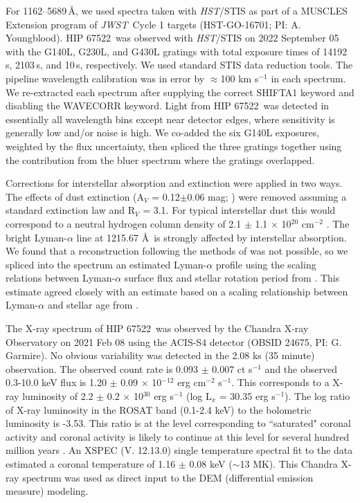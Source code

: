 \documentclass[twocolumn]{aastex63} %
\newcommand{\jwst}{\textit{JWST}}
\newcommand{\hst}{\textit{HST}}
\newcommand{\starname}{HIP 67522}
\begin{document}
For 1162--5689\,\AA, we used spectra taken with \hst/STIS as part of a MUSCLES Extension program of \jwst\ Cycle 1 targets (HST-GO-16701; PI: A. Youngblood). \starname\ was observed with \hst/STIS on 2022 September 05 with the G140L, G230L, and G430L gratings with total exposure times of 14192\,s, 2103\,s, and 10\,s, respectively. We used standard STIS data reduction tools. The pipeline wavelength calibration was in error by $\approx$100 km s$^{-1}$ in each spectrum. We re-extracted each spectrum after supplying the correct SHIFTA1 keyword and disabling the WAVECORR keyword. Light from \starname\ was detected in essentially all wavelength bins except near detector edges, where sensitivity is generally low and/or noise is high. We co-added the six G140L exposures, weighted by the flux uncertainty, then spliced the three gratings together using the contribution from the bluer spectrum where the gratings overlapped.  

Corrections for interstellar absorption and extinction were applied in two ways. The effects of dust extinction (A$_V$ = 0.12$\pm$0.06 mag; \citealt{Rizzuto2020}) were removed assuming a standard extinction law and R$_V$ = 3.1. For typical interstellar dust this would correspond to a neutral hydrogen column density of 2.1 $\pm$ 1.1 $\times$ 10$^{20}$ cm$^{-2}$ \citep{Predehl1995}. The bright Lyman-$\alpha$ line at 1215.67 \AA\ is strongly affected by interstellar  absorption. We found that a reconstruction following the methods of \cite{Youngblood2016} was not possible, so we spliced into the spectrum an estimated Lyman-$\alpha$ profile using the scaling relations between Lyman-$\alpha$ surface flux and stellar rotation period from \cite{Wood2005}. This estimate agreed closely with an estimate based on a scaling relationship between Lyman-$\alpha$ and stellar age from \cite{Ribas2005}.

The X-ray spectrum of \starname\ was observed by the Chandra X-ray Observatory on 2021 Feb 08 using the ACIS-S4 detector (OBSID 24675, PI: G. Garmire). No obvious variability was detected in the 2.08 ks (35 minute) observation. The observed count rate is 0.093 $\pm$ 0.007 ct s$^{-1}$ and the observed 0.3-10.0 keV flux is 1.20 $\pm$ 0.09 $\times$ 10$^{-12}$ erg cm$^{-2}$ s$^{-1}$. This corresponds to a X-ray luminosity of 2.2 $\pm$ 0.2 $\times$ 10$^{30}$ erg s$^{-1}$ (log L$_x$ = 30.35 erg s$^{-1}$). The log ratio of X-ray luminosity in the ROSAT band (0.1-2.4 keV) to the bolometric luminosity is -3.53. This ratio is at the level corresponding to ``saturated" coronal activity \citep{VilhuWalter1987, Pizzolato2003,Wright2018} and coronal activity is likely to continue at this level for several hundred million years \citep{Johnstone2021A&A...649A..96J}. An XSPEC (V. 12.13.0) single temperature spectral fit to the data estimated a coronal temperature of 1.16 $\pm$ 0.08 keV ($\sim$13 MK). This Chandra X-ray spectrum was used as direct input to the DEM (differential emission measure) modeling.
\end{document}
